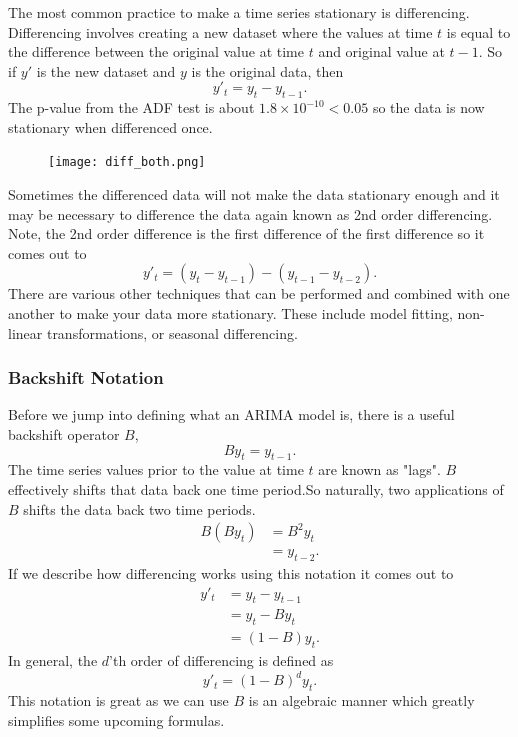 \documentclass{article}
\begin{document}
    The most common practice to make a time series stationary is differencing. Differencing involves creating a new dataset where the values at time $t$ is equal to the difference between the original value at time $t$ and original value at $t-1$. So if $y'$ is the new dataset and $y$ is the original data, then
    \begin{equation*}
      y'_t = y_t - y_{t-1}.
    \end{equation*}
    The p-value from the ADF test is about $1.8 \times 10^{-10} < 0.05$ so the data is now stationary when differenced once.
    \begin{figure}[H]
      \centering
      \texttt{[image: diff\_both.png]}
    \end{figure}
    Sometimes the differenced data will not make the data stationary enough and it may be necessary to difference the data again known as 2nd order differencing. Note, the 2nd order difference is the first difference of the first difference so it comes out to
    \begin{equation*}
      y'_t = (y_t - y_{t-1}) - (y_{t-1} - y_{t-2}).
    \end{equation*}
    There are various other techniques that can be performed and combined with one another to make your data more stationary. These include model fitting, non-linear transformations, or seasonal differencing.

    \subsubsection{Backshift Notation}
    Before we jump into defining what an ARIMA model is, there is a useful backshift operator $B$,
    \begin{equation*}
      By_t = y_{t-1}.
    \end{equation*}
    The time series values prior to the value at time $t$ are known as "lags". $B$ effectively shifts that data back one time period.So naturally, two applications of $B$ shifts the data back two time periods. 
    \begin{align*}
      B(By_t) &= B^2y_t \\
      &= y_{t-2}.
    \end{align*}
    If we describe how differencing works using this notation it comes out to
    \begin{align*}
      y'_t &= y_t - y_{t-1} \\
      &= y_t - By_t \\
      &= (1 - B)y_t.
    \end{align*}
    In general, the $d$'th order of differencing is defined as 
    \begin{equation*}
      y'_t = (1 - B)^dy_t.
    \end{equation*}
    This notation is great as we can use $B$ is an algebraic manner which greatly simplifies some upcoming formulas.
\end{document}
